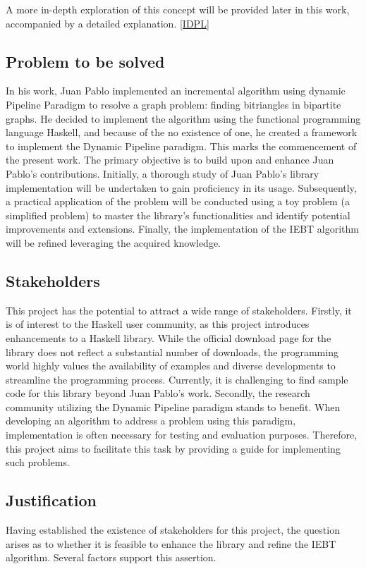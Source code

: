 A more in-depth exploration of this concept will be provided later in this work, accompanied by a detailed explanation. \ref{IDPL}
\subsection{Problem to be solved}
In his work, Juan Pablo implemented an incremental algorithm using dynamic Pipeline Paradigm to resolve a graph problem: finding bitriangles in bipartite graphs.
He decided to implement the algorithm using the functional programming language Haskell, and because of the no existence of one, he created a framework to implement the Dynamic Pipeline paradigm.
This marks the commencement of the present work.
The primary objective is to build upon and enhance Juan Pablo's contributions.
Initially, a thorough study of Juan Pablo's library implementation will be undertaken to gain proficiency in its usage.
Subsequently, a practical application of the problem will be conducted using a toy problem (a simplified problem) to master the library's functionalities and identify potential improvements and extensions.
Finally, the implementation of the IEBT algorithm will be refined leveraging the acquired knowledge.
\subsection{Stakeholders}
This project has the potential to attract a wide range of stakeholders.
Firstly, it is of interest to the Haskell user community, as this project introduces enhancements to a Haskell library.
While the official download page for the library does not reflect a substantial number of downloads, the programming world highly values the availability of examples and diverse developments to streamline the programming process.
Currently, it is challenging to find sample code for this library beyond Juan Pablo's work.
Secondly, the research community utilizing the Dynamic Pipeline paradigm stands to benefit.
When developing an algorithm to address a problem using this paradigm, implementation is often necessary for testing and evaluation purposes.
Therefore, this project aims to facilitate this task by providing a guide for implementing such problems.

\subsection{Justification}
Having established the existence of stakeholders for this project, the question arises as to whether it is feasible to enhance the library and refine the IEBT algorithm.
Several factors support this assertion. \\

